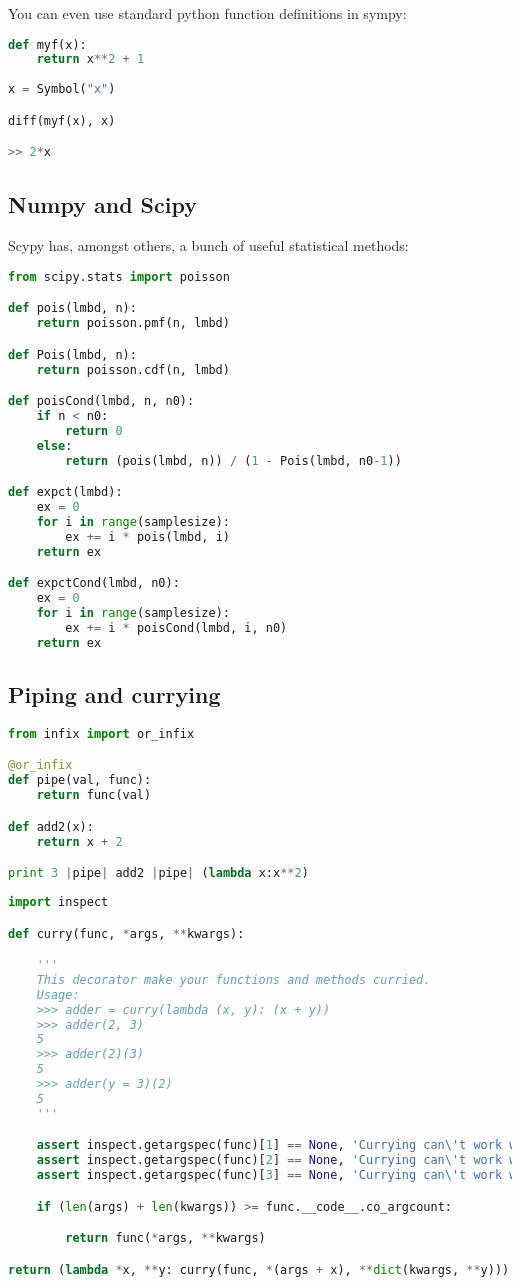 You can even use standard python function  definitions in sympy:

\begin{lstlisting}[language=python]
def myf(x):
    return x**2 + 1
    
x = Symbol("x")

diff(myf(x), x)

>> 2*x
\end{lstlisting}

\subsection{Numpy and Scipy}
Scypy has, amongst others, a bunch of useful statistical methods: 
\begin{lstlisting}[language=python]
from scipy.stats import poisson

def pois(lmbd, n):
    return poisson.pmf(n, lmbd)

def Pois(lmbd, n):
    return poisson.cdf(n, lmbd)

def poisCond(lmbd, n, n0):
    if n < n0:
        return 0
    else:
        return (pois(lmbd, n)) / (1 - Pois(lmbd, n0-1))

def expct(lmbd):
    ex = 0
    for i in range(samplesize):
        ex += i * pois(lmbd, i)
    return ex

def expctCond(lmbd, n0):
    ex = 0
    for i in range(samplesize):
        ex += i * poisCond(lmbd, i, n0)
    return ex
\end{lstlisting}

\subsection{Piping and currying}
\begin{lstlisting}[language=python]
from infix import or_infix

@or_infix
def pipe(val, func):
    return func(val)

def add2(x):
    return x + 2

print 3 |pipe| add2 |pipe| (lambda x:x**2)
\end{lstlisting}

\begin{lstlisting}[language=python]
import inspect

def curry(func, *args, **kwargs):

    '''
    This decorator make your functions and methods curried.
    Usage:
    >>> adder = curry(lambda (x, y): (x + y))
    >>> adder(2, 3)
    5
    >>> adder(2)(3)
    5
    >>> adder(y = 3)(2)
    5
    '''

    assert inspect.getargspec(func)[1] == None, 'Currying can\'t work with *args syntax'
    assert inspect.getargspec(func)[2] == None, 'Currying can\'t work with *kwargs syntax'
    assert inspect.getargspec(func)[3] == None, 'Currying can\'t work with default arguments'

    if (len(args) + len(kwargs)) >= func.__code__.co_argcount:

        return func(*args, **kwargs)

return (lambda *x, **y: curry(func, *(args + x), **dict(kwargs, **y)))
\end{lstlisting}

